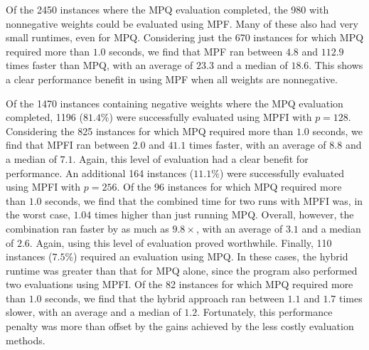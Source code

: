 \documentclass[letterpaper,USenglish,cleveref, autoref, thm-restate]{lipics-v2021}
\begin{document}
Of the 2450 instances where the MPQ evaluation completed, the 980 with nonnegative weights could be evaluated using MPF\@.  Many of these also had very small runtimes, even for MPQ\@.
Considering just the 670 instances for which MPQ required more than $1.0$ seconds, we find that MPF ran between $4.8$ and $112.9$ times faster than MPQ, with an average of $23.3$ and a median of $18.6$.  This shows a clear performance benefit in using MPF when all weights are nonnegative.

Of the 1470 instances  containing negative weights where the MPQ evaluation completed, 1196 ($81.4\%$)
were successfully evaluated using MPFI with $p=128$.  Considering the
825 instances for which MPQ required more than $1.0$ seconds, we find
that MPFI ran between $2.0$ and $41.1$ times faster, with an average of
$8.8$ and a median of $7.1$.  Again, this level of evaluation had a
clear benefit for performance.  An additional 164 instances
($11.1\%$) were successfully evaluated using MPFI with $p=256$.  Of
the 96 instances for which MPQ required more than $1.0$ seconds, we
find that the combined time for two runs with MPFI was, in the worst
case, $1.04$ times higher than just running MPQ\@.  Overall, however,
the combination ran faster by as much as $9.8\times$, with an average
of $3.1$ and a median of $2.6$.  Again, using this level of evaluation
proved worthwhile.  Finally, 110 instances ($7.5\%$) required an
evaluation using MPQ\@.  In these cases, the hybrid runtime was
greater than that for MPQ alone, since the program also performed two
evaluations using MPFI\@.  Of the 82 instances for which MPQ required
more than $1.0$ seconds, we find that the hybrid approach ran between
$1.1$ and $1.7$ times slower, with an average and a median of $1.2$.
Fortunately, this performance penalty was more than offset by the gains achieved by the less costly evaluation methods.
\end{document}
